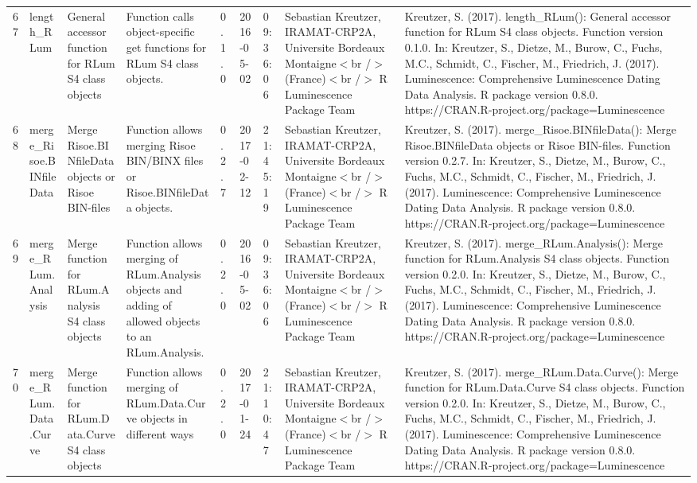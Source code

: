 \begin{table}[ht]
\begin{tabular}{rllllllll}
  67 & length\_RLum & General accessor function for RLum S4 class objects & Function calls object-specific get functions for RLum S4 class objects. & 0.1.0 & 2016-05-02 & 09:36:06
 & Sebastian Kreutzer, IRAMAT-CRP2A, Universite Bordeaux Montaigne$<$br /$>$ (France)$<$br /$>$  R Luminescence Package Team & Kreutzer, S. (2017). length\_RLum(): General accessor function for RLum S4 class objects. Function version 0.1.0. In: Kreutzer, S., Dietze, M., Burow, C., Fuchs, M.C., Schmidt, C., Fischer, M., Friedrich, J. (2017). Luminescence: Comprehensive Luminescence Dating Data Analysis. R package version 0.8.0. https://CRAN.R-project.org/package=Luminescence
 \\ 
  68 & merge\_Risoe.BINfileData & Merge Risoe.BINfileData objects or Risoe BIN-files & Function allows merging Risoe BIN/BINX files or Risoe.BINfileData objects. & 0.2.7 & 2017-02-12 & 21:45:19
 & Sebastian Kreutzer, IRAMAT-CRP2A, Universite Bordeaux Montaigne$<$br /$>$ (France)$<$br /$>$  R Luminescence Package Team & Kreutzer, S. (2017). merge\_Risoe.BINfileData(): Merge Risoe.BINfileData objects or Risoe BIN-files. Function version 0.2.7. In: Kreutzer, S., Dietze, M., Burow, C., Fuchs, M.C., Schmidt, C., Fischer, M., Friedrich, J. (2017). Luminescence: Comprehensive Luminescence Dating Data Analysis. R package version 0.8.0. https://CRAN.R-project.org/package=Luminescence
 \\ 
  69 & merge\_RLum.Analysis & Merge function for RLum.Analysis S4 class objects & Function allows merging of RLum.Analysis objects and adding of allowed objects to an RLum.Analysis. & 0.2.0 & 2016-05-02 & 09:36:06
 & Sebastian Kreutzer, IRAMAT-CRP2A, Universite Bordeaux Montaigne$<$br /$>$ (France)$<$br /$>$  R Luminescence Package Team & Kreutzer, S. (2017). merge\_RLum.Analysis(): Merge function for RLum.Analysis S4 class objects. Function version 0.2.0. In: Kreutzer, S., Dietze, M., Burow, C., Fuchs, M.C., Schmidt, C., Fischer, M., Friedrich, J. (2017). Luminescence: Comprehensive Luminescence Dating Data Analysis. R package version 0.8.0. https://CRAN.R-project.org/package=Luminescence
 \\ 
  70 & merge\_RLum.Data.Curve & Merge function for RLum.Data.Curve S4 class objects & Function allows merging of RLum.Data.Curve objects in different ways & 0.2.0 & 2017-01-24 & 21:10:47
 & Sebastian Kreutzer, IRAMAT-CRP2A, Universite Bordeaux Montaigne$<$br /$>$ (France)$<$br /$>$  R Luminescence Package Team & Kreutzer, S. (2017). merge\_RLum.Data.Curve(): Merge function for RLum.Data.Curve S4 class objects. Function version 0.2.0. In: Kreutzer, S., Dietze, M., Burow, C., Fuchs, M.C., Schmidt, C., Fischer, M., Friedrich, J. (2017). Luminescence: Comprehensive Luminescence Dating Data Analysis. R package version 0.8.0. https://CRAN.R-project.org/package=Luminescence

\end{tabular}
\end{table}
